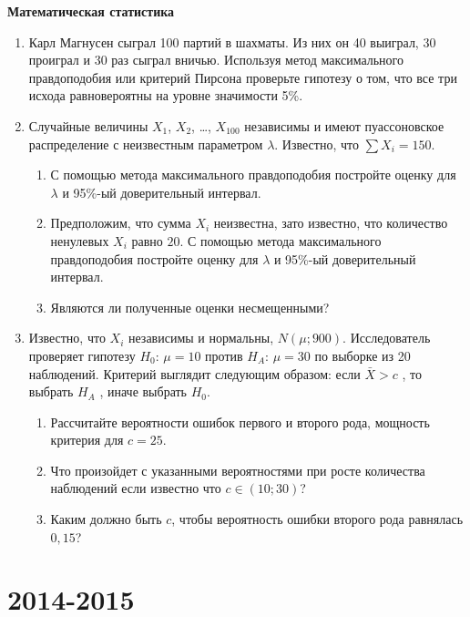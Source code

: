 \documentclass[12pt, a4paper]{article}\usepackage[]{graphicx}\usepackage[]{color}
\begin{document}
\textbf{Математическая статистика}

\begin{enumerate}[resume]


\item Карл Магнусен сыграл 100 партий в шахматы. Из них он 40 выиграл, 30 проиграл и 30 раз сыграл вничью. Используя метод максимального правдоподобия или критерий Пирсона проверьте гипотезу о том, что все три исхода равновероятны на уровне значимости 5\%.


\item Случайные величины $X_1$, $X_2$, \ldots, $X_{100}$ независимы и имеют пуассоновское распределение с неизвестным параметром $\lambda$. Известно, что $\sum X_i = 150$.
\begin{enumerate}
\item С помощью метода максимального правдоподобия постройте оценку для $\lambda$ и 95\%-ый доверительный интервал.
\item Предположим, что сумма  $X_i$ неизвестна, зато известно, что количество ненулевых $X_i$ равно $20$.  С помощью метода максимального правдоподобия постройте оценку для $\lambda$ и 95\%-ый доверительный интервал.
\item Являются ли полученные оценки несмещенными?
\end{enumerate}


\item  Известно, что  $X_{i}$ независимы и нормальны, $N\left(\mu ;900\right)$.
Исследователь проверяет гипотезу $H_{0}$: $\mu =10$  против
$H_{A}$: $\mu =30$  по выборке из 20 наблюдений. Критерий выглядит
следующим образом: если  $\bar{X}>c$ , то выбрать  $H_{A} $ ,
иначе выбрать  $H_{0} $.
\begin{enumerate}
\item  Рассчитайте вероятности ошибок
первого и второго рода, мощность критерия для $c=25$.
\item Что произойдет с указанными вероятностями при росте количества
наблюдений если известно что $c\in(10;30)$?
\item Каким должно быть $c$, чтобы вероятность ошибки второго рода
равнялась $0,15$?
\end{enumerate}
\end{enumerate}



\section{2014-2015}
\end{document}
